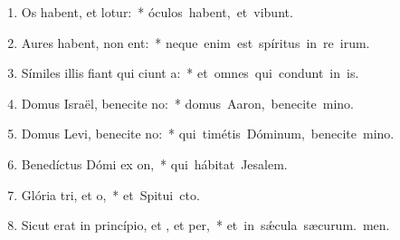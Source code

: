 \begin{flushleft}
\begin{enumerate}[leftmargin=*]
\item Os habent, et  lotur:~* \mbox{óculos habent, et  vibunt.}
\item Aures habent,  non ent:~* \mbox{neque enim est spíritus in re irum.}
\item Símiles illis fiant qui ciunt a:~* \mbox{et omnes qui condunt in is.}
\item Domus Israël, benecite no:~* \mbox{domus Aaron, benecite mino.}
\item Domus Levi, benecite no:~* \mbox{qui timétis Dóminum, benecite mino.}
\item Benedíctus Dómi ex on,~* \mbox{qui hábitat  Jesalem.}
\item Glória tri, et o,~* \mbox{et Spitui cto.}
\item Sicut erat in princípio, et , et per,~* \mbox{et in s\'{\ae}cula sæcurum. men.}


\end{enumerate}
\end{flushleft}

